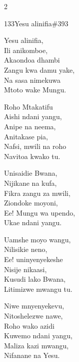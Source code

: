 \documentclass{article}
\begin{document}
\begin{multicols}{2}
\begin{hymn}{133}{Yesu alinifia}{\#393}
\begin{stanza}
Yesu alinifia,\\
Ili anikomboe,\\
Akaondoa dhambi\\
Zangu kwa damu yake,\\
Na sasa nimekuwa\\
Mtoto wake Mungu.
\end{stanza}
\begin{stanza}
Roho Mtakatifu\\
Aishi ndani yangu,\\
Anipe na neema,\\
Anitakase pia,\\
Nafsi, mwili na roho\\
Navitoa kwako tu.
\end{stanza}
\begin{stanza}
Unisaidie Bwana,\\
Nijikane na kufa,\\
Fikra zangu za mwili,\\
Ziondoke moyoni,\\
Ee! Mungu wa upendo,\\
Ukae ndani yangu.
\end{stanza}
\begin{stanza}
Uamshe moyo wangu,\\
Nilisikie neno,\\
Ee! uninyenyekeshe\\
Nisije nikaasi,\\
Kusudi lako Bwana,\\
Litimizwe mwangu tu.
\end{stanza}
\begin{stanza}
Niwe mnyenyekevu,\\
Nitoshelezwe nawe,\\
Roho wako azidi\\
Kuwemo ndani yangu,\\
Maliza kazi mwangu,\\
Nifanane na Yesu.
\end{stanza}
\end{hymn}


\end{multicols}
\end{document}
